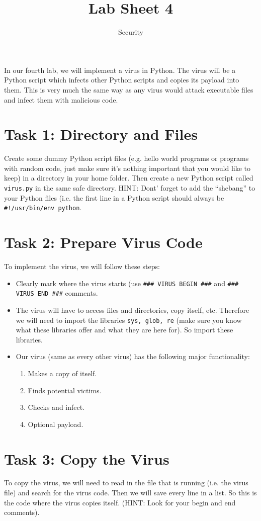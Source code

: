 \documentclass{article}
\title{Lab Sheet 4}
\date{Security}
\begin{document}
\maketitle

In our fourth lab, we will implement a virus in Python. The virus will be a Python script which infects other Python scripts and copies its payload into them. This is very much the same way as any virus would attack executable files and infect them with malicious code.

\section{Task 1: Directory and Files}
Create some dummy Python script files (e.g. hello world programs or programs with  random code, just make sure it's nothing important that you would like to keep) in a directory in your home folder. Then create a new Python script called \texttt{virus.py} in the same safe directory. HINT: Dont' forget to add the ``shebang'' to your Python files (i.e. the first line in a Python script should always be \texttt{\#!/usr/bin/env python}.

\section{Task 2: Prepare Virus Code}
To implement the virus, we will follow these steps:
\begin{itemize}
\item Clearly mark where the virus starts (use \texttt{\#\#\# VIRUS BEGIN \#\#\#} and \texttt{\#\#\# VIRUS END \#\#\#} comments.
\item The virus will have to access files and directories, copy itself, etc. Therefore we will need to import the libraries \texttt{sys, glob, re} (make sure you know what these libraries offer and what they are here for). So import these libraries.
\item Our virus (same as every other virus) has the following major functionality:
  \begin{enumerate}
  \item Makes a copy of itself.
  \item Finds potential victims.
  \item Checks and infect.
  \item Optional payload.
  \end{enumerate}
\end{itemize}

\section{Task 3: Copy the Virus}
To copy the virus, we will need to read in the file that is running (i.e. the virus file) and search for the virus code. Then we will save every line in a list. So this is the code where the virus copies itself. (HINT: Look for your begin and end comments).
\end{document}
